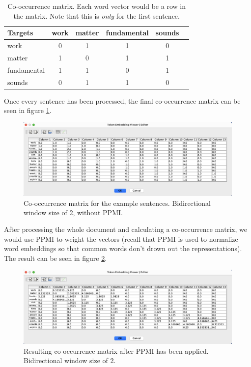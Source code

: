 \begin{table}[h]
    \centering
    \begin{tabular}{|l|c|c|c|c|c|}
    \hline
    Targets & work & matter & fundamental & sounds \\
    \hline
    work & 0 & 1 & 1 & 0 \\
    \hline
    matter & 1 & 0 & 1 & 1  \\
    \hline
    fundamental & 1 & 1 & 0 & 1  \\
    \hline
    sounds & 0 & 1 & 1 & 0  \\
    \hline
    \end{tabular}
    \caption{Co-occurrence matrix. Each word vector would be a row in the matrix. Note that this is \textit{only} for the first sentence.}
    \label{exampleCoocmat}
\end{table}

Once every sentence has been processed, the final co-occurrence matrix can be seen in figure \ref{coocExample}.

\begin{figure}[h]
    \centering
    \includegraphics[scale=0.4]{./images/full_cooc_matrix.png}
    \caption[Generated using Simbrain.]{Co-occurrence matrix for the example sentences. Bidirectional window size of 2, without PPMI.}
 \label{coocExample}
\end{figure}

After processing the whole document and calculating a co-occurrence matrix, we would use PPMI to weight the vectors (recall that PPMI is used to normalize word embeddings so that common words don't drown out the representations). The result can be seen in figure \ref{ppmiExample}.

\begin{figure}[h]
    \centering
    \includegraphics[scale=0.4]{./images/weighted_cooc_matrix.png}
    \caption[Generated using Simbrain.]{Resulting co-occurrence matrix after PPMI has been applied. Bidirectional window size of 2.}
 \label{ppmiExample}
\end{figure}

